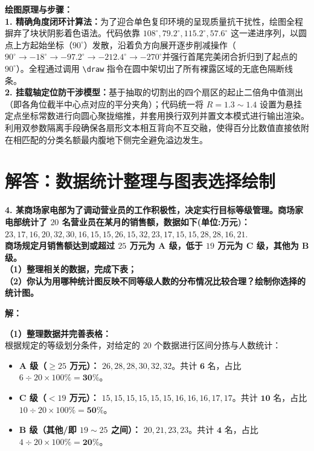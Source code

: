 \documentclass[12pt, a4paper]{ctexrep}
\begin{document}
\vspace{0.6cm}

{\small\color{blue!70!black}
\textbf{绘图原理与步骤：}\\
\textbf{1. 精确角度闭环计算法：}为了迎合单色复印环境的呈现质量抗干扰性，绘图全程摒弃了块状阴影着色语法。代码依靠 $108^\circ, 79.2^\circ, 115.2^\circ, 57.6^\circ$ 这一递进序列，以圆点上方起始坐标（$90^\circ$）发散，沿着负方向展开逐步削减操作（$90^\circ \to -18^\circ \to -97.2^\circ \to -212.4^\circ \to -270^\circ$并强行首尾完美闭合折归到了起点的 $90^\circ$）。全程通过调用 \texttt{\textbackslash draw} 指令在圆中架切出了所有裸露区域的无底色隔断线条。\\
\textbf{2. 挂载轴定位防干涉模型：}基于抽取的切割出的四个扇区的起止二倍角中值测出（即各角位截半中心点对应的平分夹角）；代码统一将 $R=1.3 \sim 1.4$ 设置为悬挂定点坐标常数进行向圆心聚拢缩推，并套用换行双列并置文本模式进行输出渲染。利用双参数隔离手段确保各扇形文本相互背向不互交融，使得百分比数值直接依附在相匹配的分类名额最内腹地下侧完全避免溢边发生。
}

\newpage

\section{解答：数据统计整理与图表选择绘制}

\vspace{0.6cm}

\textbf{4. 某商场家电部为了调动营业员的工作积极性，决定实行目标等级管理。商场家电部统计了 $20$ 名营业员在某月的销售额，数据如下(单位:万元)：}\\
$23,17,16,20,32,30,16,15,15,26,15,32,23,17,15,15,28,28,16,21.$\\
\textbf{商场规定月销售额达到或超过 $25$ 万元为 A 级，低于 $19$ 万元为 C 级，其他为 B 级。}\\
\textbf{（1）整理相关的数据，完成下表；}\\
\textbf{（2）你认为用哪种统计图反映不同等级人数的分布情况比较合理？绘制你选择的统计图。}

\vspace{0.4cm}

\textbf{解：}

\textbf{（1）整理数据并完善表格：} \\
根据规定的等级划分条件，对给定的 $20$ 个数据进行区间分拣与人数统计：
\begin{itemize}
  \item \textbf{A 级（$\geqslant 25$ 万元）：} $26, 28, 28, 30, 32, 32$。共计 $\boldsymbol{6}$ 名，占比 $6 \div 20 \times 100\% = \boldsymbol{30\%}$。
  \item \textbf{C 级（$< 19$ 万元）：} $15, 15, 15, 15, 15, 15, 16, 16, 16, 17, 17$。共计 $\boldsymbol{10}$ 名，占比 $10 \div 20 \times 100\% = \boldsymbol{50\%}$。
  \item \textbf{B 级（其他/即 $19 \sim 25$ 之间）：} $20, 21, 23, 23$。共计 $\boldsymbol{4}$ 名，占比 $4 \div 20 \times 100\% = \boldsymbol{20\%}$。
\end{itemize}
\end{document}
